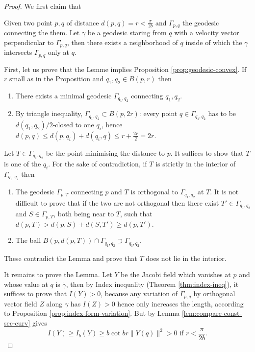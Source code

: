 \documentclass[11pt]{article}
\begin{document}
\begin{proof}
We first claim that
\begin{lemma}
Given two point \(p,q\) of distance \(d(p,q) = r < \frac{\pi}{2b}\) and \(\Gamma_{p,q}\) the geodesic connecting the them. Let \(\gamma\) be a geodesic staring
from \(q\) with a velocity vector perpendicular to \(\Gamma_{p,q}\), then there exists
a neighborhood of \(q\) inside of which the \(\gamma\) intersects \(\Gamma_{p,q}\)
only at \(q\).
\end{lemma}

First, let us prove that the Lemme implies Proposition \ref{prop:geodesic-convex}. If \(r\) small as in the Proposition and \(q_1, q_2\in B(p,r)\) then
\begin{enumerate}
\item There exists a minimal geodesic \(\Gamma_{q_1,q_2}\) connecting \(q_1, q_2\).
\item By triangle inequality, \(\Gamma_{q_1, q_2}\subset B(p,2r)\): every point \(q\in
   \Gamma_{q_1,q_2}\) has to be \(d(q_1,q_2)/2\)-closed to one \(q_i\), hence \(d(p,q)\leq d(p,q_i) + d(q_i,q) \leq r + \frac{2r}{2} = 2r\).
\end{enumerate}
Let \(T \in \Gamma_{q_1, q_2}\) be the point minimising the distance to \(p\). It
suffices to show that \(T\) is one of the \(q_i\). For the sake of contradiction, if
\(T\) is strictly in the interior of \(\Gamma_{q_1,q_2}\) then
\begin{enumerate}
\item The geodesic \(\Gamma_{p,T}\) connecting \(p\) and \(T\) is orthogonal to \(\Gamma_{q_1,q_2}\) at \(T\). It is not difficult to prove that if the two are not
orthogonal then there exist \(T'\in \Gamma_{q_1,q_2}\) and \(S\in \Gamma_{p,T}\),
both being near to \(T\), such that \(d(p,T) > d(p, S) + d(S,T') \geq d(p,T')\).
\item The ball \(B(p,d(p,T))\cap \Gamma_{q_1,q_2} \supset \Gamma_{q_1,q_2}\).
\end{enumerate}

These contradict the Lemma and prove that \(T\) does not lie in the interior.

It remains to prove the Lemma. Let \(Y\) be the Jacobi field which vanishes at \(p\)
and whose value at \(q\) is \(\dot\gamma\), then by Index inequality (Theorem
\ref{thm:index-ineq}), it suffices to prove that \(I(Y)>0\), because any variation of \(\Gamma_{p,q}\) by orthogonal vector field \(Z\) along \(\gamma\) has \(I(Z) >0\) hence only increases the length,
according to Proposition \ref{prop:index-form-variation}. But by Lemma
\ref{lem:compare-const-sec-curv} gives
\[
 I(Y) \geq I_b(Y) \geq b\cot br \| Y(q) \|^2 >0 \text{ if } r < \frac{\pi}{2b}.
\]
\end{proof}
\end{document}
